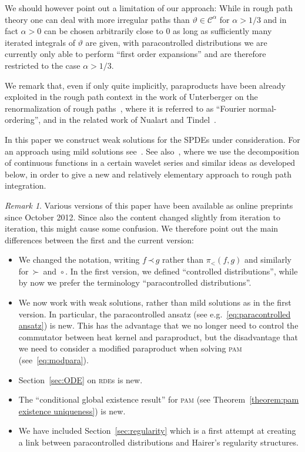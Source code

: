\documentclass[a4paper,11pt]{article}
\theoremstyle{remark}
\newtheorem{remark}[theorem]{Remark}
\newcommand{\CC}{\ensuremath{\mathscr{C}}}
\newcommand{\lpara}{\,\mathord{\prec}\,}
\newcommand{\rpara}{\,\mathord{\succ}\,}
\newcommand{\reso}{\,\mathord{\circ}\,}
\begin{document}
We should however point out a limitation of our approach: While in rough path theory one can deal with more irregular paths than $\vartheta \in \CC^{\alpha}$ for $\alpha > 1/3$ and in fact $\alpha>0$ can be chosen arbitrarily close to $0$ as long as sufficiently many iterated integrals of $\vartheta$ are given, with paracontrolled distributions we are currently only able to perform ``first order expansions'' and are therefore restricted to the case $\alpha>1/3$.


\bigskip


We remark that, even if only quite implicitly, paraproducts  have been already exploited in the rough path context in the work of Unterberger on the renormalization of rough paths~\cite{Unterberger2010a, Unterberger2010}, where it is referred to as ``Fourier normal-ordering'', and in the related work of Nualart and Tindel~{\cite{Nualart2011}}.

In this paper we construct weak solutions for the SPDEs under consideration. For an approach using mild solutions see~\cite{Perkowski2014Thesis}. See also~\cite{Gubinelli2013}, where we use the decomposition of continuous functions in a certain wavelet series and similar ideas as developed below, in order to give a new and relatively elementary approach to rough path integration.

\begin{remark}
Various versions of this paper have been available as online preprints since October 2012. Since also the content changed slightly from iteration to iteration, this might cause some confusion. We therefore point out the main differences between the first and the current version:
\begin{itemize}
   \item[--] We changed the notation, writing $f \lpara g$ rather than $\pi_<(f,g)$ and similarly for $\rpara$ and $\reso$. In the first version, we defined ``controlled distributions'', while by now we prefer the terminology ``paracontrolled distributions''.
   \item[--] We now work with weak solutions, rather than mild solutions as in the first version. In particular, the paracontrolled ansatz (see e.g.~\eqref{eq:paracontrolled ansatz}) is new. This has the advantage that we no longer need to control the commutator between heat kernel and paraproduct, but the disadvantage that we need to consider a modified paraproduct when solving \textsc{pam} (see~\eqref{eq:modpara}).
   \item[--] Section~\ref{sec:ODE} on \textsc{rde}s is new. 
   \item[--] The ``conditional global existence result'' for \textsc{pam} (see Theorem~\ref{theorem:pam existence uniqueness}) is new.
   \item[--] We have included Section~\ref{sec:regularity} which is a first attempt at creating a link between paracontrolled distributions and Hairer's regularity structures.
\end{itemize}
\end{remark}
\end{document}
